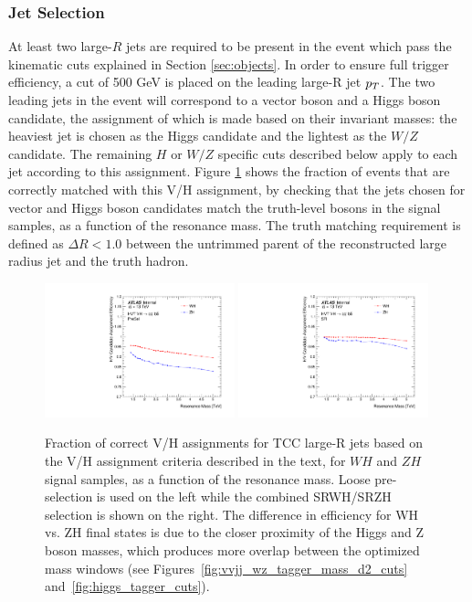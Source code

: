 \subsubsection{Jet Selection}
At least two large-$R$ jets are required to be present in the event which pass the kinematic cuts explained in Section \ref{sec:objects}.
In order to ensure full trigger efficiency, a cut of 500 GeV is placed on the leading large-R jet $p_{T}$.
The two leading jets in the event will correspond to a vector boson and a Higgs boson candidate, the assignment of which is made based on their invariant masses: the heaviest jet is chosen as the Higgs candidate and the lightest as the $W/Z$ candidate.
The remaining $H$ or $W/Z$ specific cuts described below apply to each jet according to this assignment.
Figure \ref{fig:assignment} shows the fraction of events that are correctly matched with this V/H assignment, by checking that the jets chosen for vector and Higgs boson candidates match the truth-level bosons in the signal samples, as a function of the resonance mass.
The truth matching requirement is defined as $\Delta R < 1.0$ between the untrimmed parent of the reconstructed large radius jet and the truth hadron.

\begin{figure}[htbp!]
\begin{center}
\includegraphics[width=0.49\textwidth]{VHqqbb_HVCandAssignEff_presel.pdf}
\includegraphics[width=0.49\textwidth]{VHqqbb_HVCandAssignEff_SR.pdf}
\end{center}
\caption{
Fraction of correct V/H assignments for TCC large-R jets based on the V/H assignment criteria described in the text, for $WH$ and $ZH$ signal samples, as a function of the resonance mass.
Loose pre-selection is used on the left while the combined SRWH/SRZH selection is shown on the right.
The difference in efficiency for WH vs. ZH final states is due to the closer proximity of the Higgs and Z boson masses, which produces more overlap between the optimized mass windows (see Figures~\ref{fig:vvjj_wz_tagger_mass_d2_cuts} and~\ref{fig:higgs_tagger_cuts}).
}
\label{fig:assignment}
\end{figure}

